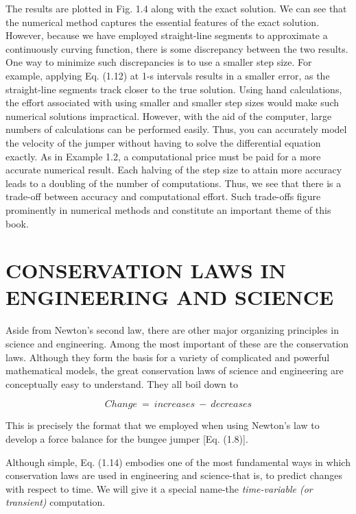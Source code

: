 \documentclass[../main.tex]{subfiles}
\begin{document}
The results are plotted in Fig. 1.4 along with the exact solution. We can see that the numerical method captures the essential features of the exact solution. However, because we
have employed straight-line segments to approximate a continuously curving function,
there is some discrepancy between the two results. One way to minimize such discrepancies is to use a smaller step size. For example, applying Eq. (1.12) at 1-s intervals results in
a smaller error, as the straight-line segments track closer to the true solution. Using hand
calculations, the effort associated with using smaller and smaller step sizes would make
such numerical solutions impractical. However, with the aid of the computer, large numbers of calculations can be performed easily. Thus, you can accurately model the velocity
of the jumper without having to solve the differential equation exactly. As in Example 1.2, a computational price must be paid for a more accurate numerical
result. Each halving of the step size to attain more accuracy leads to a doubling of the number of computations. Thus, we see that there is a trade-off between accuracy and computational effort. Such trade-offs figure prominently in numerical methods and constitute an
important theme of this book. 


\section {CONSERVATION LAWS IN ENGINEERING AND SCIENCE}

Aside from Newton's second law, there are other major organizing principles in science
and engineering. Among the most important of these are the conservation laws. Although
they form the basis for a variety of complicated and powerful mathematical models, the
great conservation laws of science and engineering are conceptually easy to understand.
They all boil down to

\begin{equation}
	\tag{1.14}
	Change\ = \ increases \ − \ decreases
\end{equation}

This is precisely the format that we employed when using Newton's law to develop a force
balance for the bungee jumper [Eq. (1.8)].

Although simple, Eq. (1.14) embodies one of the most fundamental ways in which
conservation laws are used in engineering and science-that is, to predict changes
with respect to time. We will give it a special name-the \textsl{time-variable (or transient)}
computation.
\end{document}
